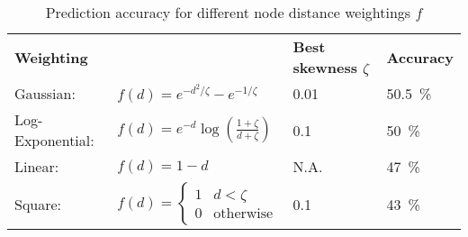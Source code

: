 \begin{table}[H]
\caption{Prediction accuracy for different node distance weightings $f$}
\begin{center}
\begin{tabular}{l l l l}
\multicolumn{2}{l}{
\textbf{Weighting}}														& \textbf{Best skewness $\zeta$}		& \textbf{Accuracy}\\

Gaussian:			& $f(d)=e^{-d^2/\zeta}-e^{-1/\zeta}$							& \SI{0.01}{}						&\SI{50.5}{\percent} \\

Log-Exponential:	& $f(d)=e^{-d} \log\left( \frac{1+\zeta}{d+\zeta}\right)$				&\SI{0.1}{}							& \SI{50}{\percent} \\ 

Linear:			& $f(d)=1-d$											& N.A. 							&\SI{47}{\percent} \\

Square:			&$f(d)= \begin{cases}
1				&d < \zeta \\
0				& \text{otherwise}
				\end{cases}$											& \SI{0.1}{}						& \SI{43}{\percent}
\end{tabular}
\end{center}
\label{tab:Prediction accuracy for different node distance weightings}
\end{table}

